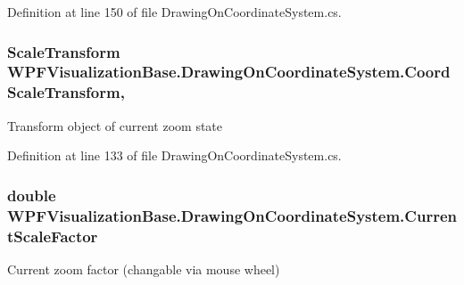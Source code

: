 Definition at line 150 of file Drawing\+On\+Coordinate\+System.\+cs.

\subsubsection[{\texorpdfstring{Coord\+Scale\+Transform}{CoordScaleTransform}}]{\setlength{\rightskip}{0pt plus 5cm}Scale\+Transform W\+P\+F\+Visualization\+Base.\+Drawing\+On\+Coordinate\+System.\+Coord\+Scale\+Transform\hspace{0.3cm}{\ttfamily [get]}, {\ttfamily [protected]}}\hypertarget{class_w_p_f_visualization_base_1_1_drawing_on_coordinate_system_a4add8c755b9450114cf14777a16a5d1a}{}\label{class_w_p_f_visualization_base_1_1_drawing_on_coordinate_system_a4add8c755b9450114cf14777a16a5d1a}


Transform object of current zoom state 



Definition at line 133 of file Drawing\+On\+Coordinate\+System.\+cs.

\subsubsection[{\texorpdfstring{Current\+Scale\+Factor}{CurrentScaleFactor}}]{\setlength{\rightskip}{0pt plus 5cm}double W\+P\+F\+Visualization\+Base.\+Drawing\+On\+Coordinate\+System.\+Current\+Scale\+Factor\hspace{0.3cm}{\ttfamily [get]}}\hypertarget{class_w_p_f_visualization_base_1_1_drawing_on_coordinate_system_a76bef413d97a0ce03ab983b66cb3cdfb}{}\label{class_w_p_f_visualization_base_1_1_drawing_on_coordinate_system_a76bef413d97a0ce03ab983b66cb3cdfb}


Current zoom factor (changable via mouse wheel) 



